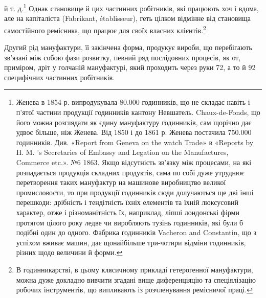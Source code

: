й т. д.\footnote{
Женева в 1854 р. випродукувала 80.000 годинників, що не складає
навіть і п’ятої частини продукції годинників кантону Невшатель.
Chaux-de-Fonds, що його можна розглядати як єдину мануфактуру годинників,
сам щорічно дає удвоє більше, ніж Женева. Від 1850 і до 1861 р.
Женева постачила 750.000 годинників. Див. «Report from Geneva on
the watch Trade» в «Reports by H. M. ’s Secretaries of Embassy and Legation
on the Manufactures, Commerce etc.». №6 1863. Якщо відсутність
зв’язку між процесами, на які розпадається продукція складних продуктів, сама по собі дуже утруднює перетворення таких мануфактур на
машинове виробництво великої промисловости, то при продукції годинників
сюди долучаються ще дві інші перешкоди: дрібність і тендітність
їхніх елементів та їхній люксусовий характер, отже і різноманітність їх,
наприклад, ліпші лондонські фірми протягом цілого року ледве чи виробляють
тузінь годинників, які були б подібні один до одного. Фабрика
годинників Vacheron and Constantin, що з успіхом вживає машин,
дає щонайбільше три-чотири відміни годинників, різних щодо величини
й форми.
} Однак становище й цих частинних робітників, які працюють
хоч і вдома, але на капіталіста (Fabrikant, établisseur),
геть цілком відмінне від становища самостійного ремісника, що
працює для своїх власних клієнтів.\footnote{
В годинникарстві, в цьому клясичному прикладі гетерогенної
мануфактури, можна дуже докладно вивчити згадані вище диференціяцію
та спеціялізацію робочих інструментів, що випливають із розчленування
ремісничої праці.
}

Другий рід мануфактури, її закінчена форма, продукує
вироби, що перебігають зв’язані між собою фази розвитку, певний
ряд послідовних процесів, як от, приміром, дріт у голчаній
мануфактурі, який проходить через руки 72, а то й 92 специфічних
частинних робітників.

